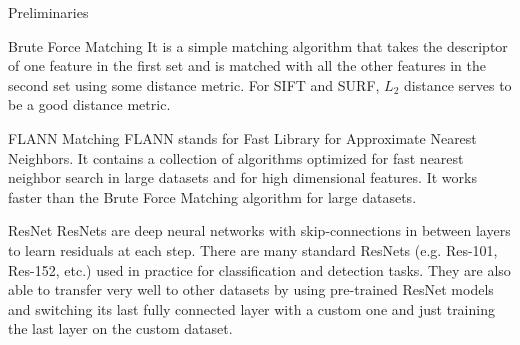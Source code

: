 \documentclass{article}
\begin{document}
\begin{ssection}{Preliminaries}
    \begin{ssubsection}{Brute Force Matching}
    It is a simple matching algorithm that takes the descriptor of one feature in the first set and is matched with all the other features in the second set using some distance metric. For SIFT and SURF, $L_2$ distance serves to be a good distance metric.
    \end{ssubsection}
    
    \begin{ssubsection}{FLANN Matching}
    FLANN stands for Fast Library for Approximate Nearest Neighbors. It contains a collection of algorithms optimized for fast nearest neighbor search in large datasets and for high dimensional features. It works faster than the Brute Force Matching algorithm for large datasets.

    \end{ssubsection}
    
    \begin{ssubsection}{ResNet}
    ResNets are deep neural networks with skip-connections in between layers to learn residuals at each step. There are many standard ResNets (e.g. Res-101, Res-152, etc.) used in practice for classification and detection tasks. They are also able to transfer very well to other datasets by using pre-trained ResNet models and switching its last fully connected layer with a custom one and just training the last layer on the custom dataset.
    \end{ssubsection}
    
\end{ssection}
\end{document}
